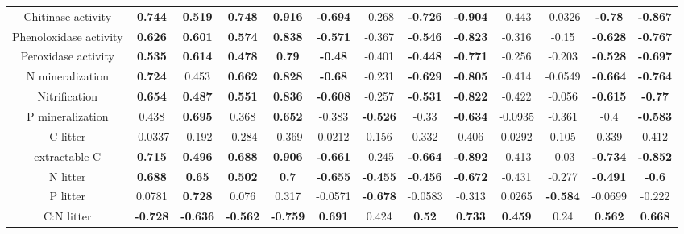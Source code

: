 \documentclass[authoryear,preprint,review,12pt]{elsarticle}
\begin{document}
\begin{landscape}
\begin{table}[h!]
\begin{center}
{\begin{tabular}{ccccccccccccc}
  Chitinase activity & \textbf{ 0.744 } & \textbf{ 0.519 } & \textbf{ 0.748 } & \textbf{ 0.916 } & \textbf{ -0.694 } & -0.268 & \textbf{ -0.726 } & \textbf{ -0.904 } & -0.443 & -0.0326 & \textbf{ -0.78 } & \textbf{ -0.867 } \\ 
  Phenoloxidase activity & \textbf{ 0.626 } & \textbf{ 0.601 } & \textbf{ 0.574 } & \textbf{ 0.838 } & \textbf{ -0.571 } & -0.367 & \textbf{ -0.546 } & \textbf{ -0.823 } & -0.316 & -0.15 & \textbf{ -0.628 } & \textbf{ -0.767 } \\ 
  Peroxidase activity & \textbf{ 0.535 } & \textbf{ 0.614 } & \textbf{ 0.478 } & \textbf{ 0.79 } & \textbf{ -0.48 } & -0.401 & \textbf{ -0.448 } & \textbf{ -0.771 } & -0.256 & -0.203 & \textbf{ -0.528 } & \textbf{ -0.697 } \\ 
  N mineralization & \textbf{ 0.724 } & 0.453 & \textbf{ 0.662 } & \textbf{ 0.828 } & \textbf{ -0.68 } & -0.231 & \textbf{ -0.629 } & \textbf{ -0.805 } & -0.414 & -0.0549 & \textbf{ -0.664 } & \textbf{ -0.764 } \\ 
  Nitrification & \textbf{ 0.654 } & \textbf{ 0.487 } & \textbf{ 0.551 } & \textbf{ 0.836 } & \textbf{ -0.608 } & -0.257 & \textbf{ -0.531 } & \textbf{ -0.822 } & -0.422 & -0.056 & \textbf{ -0.615 } & \textbf{ -0.77 } \\ 
  P mineralization & 0.438 & \textbf{ 0.695 } & 0.368 & \textbf{ 0.652 } & -0.383 & \textbf{ -0.526 } & -0.33 & \textbf{ -0.634 } & -0.0935 & -0.361 & -0.4 & \textbf{ -0.583 } \\ 
  C litter & -0.0337 & -0.192 & -0.284 & -0.369 & 0.0212 & 0.156 & 0.332 & 0.406 & 0.0292 & 0.105 & 0.339 & 0.412 \\ 
  extractable C & \textbf{ 0.715 } & \textbf{ 0.496 } & \textbf{ 0.688 } & \textbf{ 0.906 } & \textbf{ -0.661 } & -0.245 & \textbf{ -0.664 } & \textbf{ -0.892 } & -0.413 & -0.03 & \textbf{ -0.734 } & \textbf{ -0.852 } \\ 
  N litter & \textbf{ 0.688 } & \textbf{ 0.65 } & \textbf{ 0.502 } & \textbf{  0.7 } & \textbf{ -0.655 } & \textbf{ -0.455 } & \textbf{ -0.456 } & \textbf{ -0.672 } & -0.431 & -0.277 & \textbf{ -0.491 } & \textbf{ -0.6 } \\ 
  P litter & 0.0781 & \textbf{ 0.728 } & 0.076 & 0.317 & -0.0571 & \textbf{ -0.678 } & -0.0583 & -0.313 & 0.0265 & \textbf{ -0.584 } & -0.0699 & -0.222 \\ 
  C:N litter & \textbf{ -0.728 } & \textbf{ -0.636 } & \textbf{ -0.562 } & \textbf{ -0.759 } & \textbf{ 0.691 } & 0.424 & \textbf{ 0.52 } & \textbf{ 0.733 } & \textbf{ 0.459 } & 0.24 & \textbf{ 0.562 } & \textbf{ 0.668 } \\ 

\end{tabular}}
\end{center}
\end{table}
\end{landscape}
\end{document}
